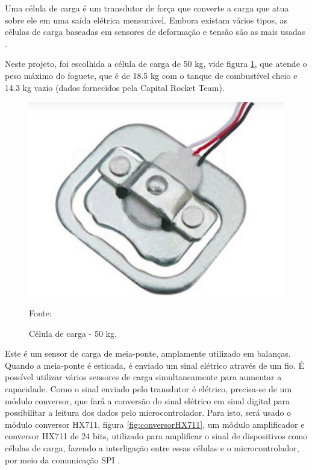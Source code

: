 Uma célula de carga é um transdutor de força que converte a carga que atua sobre ele em uma saída elétrica mensurável. Embora existam vários tipos, as células de carga baseadas em sensores de deformação e tensão são as mais usadas \cite{omega_celulacarga}. 

Neste projeto, foi escolhida a célula de carga de 50 kg, vide figura \ref{fig:celula_carga}, que atende o peso máximo do foguete, que é de 18.5 kg com o tanque de combustível cheio e 14.3 kg vazio (dados fornecidos pela Capital Rocket Team).

\begin{figure}[H]
  \centering
  \includegraphics[scale=0.75]{figuras/celula_carga.png}
  \caption{Célula de carga - 50 kg.}
  {\footnotesize Fonte: \cite{figura_celula}} 
  \label{fig:celula_carga}
\end{figure}

Este é um sensor de carga de meia-ponte, amplamente utilizado em balanças. Quando a meia-ponte é esticada, é enviado um sinal elétrico através de um fio. É possível utilizar vários sensores de carga simultaneamente para aumentar a capacidade.
Como o sinal enviado pelo transdutor é elétrico, precisa-se de um módulo conversor, que fará a conversão do sinal elétrico em sinal digital para possibilitar a leitura dos dados pelo microcontrolador. Para isto, será usado o módulo conversor HX711, figura \ref{fig:conversorHX711}, um módulo amplificador e conversor HX711 de 24 bits, utilizado para amplificar o sinal de dispositivos como células de carga, fazendo a interligação entre essas células e o microcontrolador, por meio da comunicação SPI \cite{avia_HX711}.


